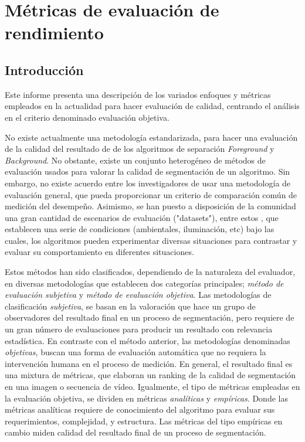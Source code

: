 \chapter{Métricas de evaluación de rendimiento}
 
\section{Introducción}

Este informe presenta una descripción de los variados enfoques y métricas empleados en la actualidad para hacer evaluación de calidad, centrando el análisis en el criterio denominado evaluación objetiva.

No existe actualmente una metodología estandarizada, para hacer una evaluación de la calidad del resultado de de los algoritmos de separación \emph{Foreground} y \emph{Background}.  No obstante, existe un conjunto heterogéneo de métodos de evaluación usados para valorar la calidad de segmentación de un algoritmo. Sin embargo, no existe acuerdo entre los investigadores de usar una metodología de evaluación general, que pueda proporcionar un criterio de comparación común de medición del desempeño. Asimismo, se han puesto a disposición de la comunidad una gran cantidad de escenarios de evaluación ("datasets"), entre estos \cite{singh_muhavi_2010}, que establecen una serie de condiciones (ambientales, iluminación, etc) bajo las cuales, los algoritmos pueden experimentar diversas situaciones para contrastar y evaluar su comportamiento en diferentes situaciones.

Estos métodos han sido clasificados, dependiendo de la naturaleza del evaluador, en diversas metodologías que establecen dos categorías principales; \emph{método de evaluación subjetiva} \cite{mckoen_evaluation_2000} y \emph{método de evaluación objetiva}. Las metodologías de clasificación \emph{subjetiva}, se basan en la valoración que hace un grupo de observadores del resultado final en un proceso de segmentación, pero requiere de un gran número de evaluaciones para producir un resultado con relevancia estadística. En contraste con el método anterior, las metodologías denominadas \emph{objetivas}, buscan una forma de evaluación automática que no requiera la intervención humana en el proceso de medición. En general, el resultado final es una mixtura de métricas, que elaboran un ranking de la calidad de segmentación en una imagen o secuencia de vídeo. Igualmente, el tipo de métricas empleadas en la evaluación objetiva, se dividen en métricas \emph{analíticas} y \emph{empíricas}. Donde las métricas analíticas requiere de conocimiento del algoritmo para evaluar sus requerimientos,  complejidad,  y estructura. Las métricas del tipo empíricas en cambio miden calidad del resultado final de un proceso de segmentación.

